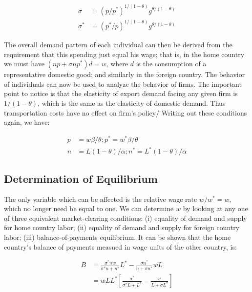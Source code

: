 \begin{equation}
    \begin{aligned}
        \sigma & = (p/p^*)^{1/(1 - \theta)}g^{\theta / (1 - \theta)} \\
        \sigma^* & = (p^*/p)^{1/(1 - \theta)}g^{\theta / (1 - \theta)}
    \end{aligned}
\end{equation}

The overall demand pattern of each individual can then be derived from the requirement that this spending just equal his wage; that is, in the home country we must have $(np + \sigma np^*)d = w$, where $d$ is the consumption of a representative domestic good; and similarly in the foreign country. The behavior of individuals can now be used to analyze the behavior of firms. The important point to notice is that the elasticity of export demand facing any given firm is $1 / (1 - \theta)$, which is the same as the elasticity of domestic demand. Thus transportation costs have no effect on firm's policy/ Writing out these conditions again, we have:

\begin{equation}
    \begin{aligned}
        p & = w\beta / \theta; p^* = w^* \beta / \theta \\
        n & = L(1 - \theta) / \alpha; n^* = L^*(1 - \theta) / \alpha
    \end{aligned}
\end{equation}

\subsection{Determination of Equilibrium}

The only variable which can be affected is the relative wage rate $w / w^* = w$, which no longer need be equal to one. We can determine $w$ by looking at any one of three equivalent market-clearing conditions: (i) equality of demand and supply for home country labor; (ii) equality of demand and supply for foreign country labor; (iii) balance-of-payments equilibrium. It can be shown that the home country's balance of payments measued in wage units of the other country, is:

\begin{equation}
    \begin{aligned}
        B & = \frac{\sigma^* nw}{\sigma^*n + n^*}L^* - \frac{\sigma n^*}{n + \sigma n^*}wL \\
        & = wLL^* \left[ \frac{\sigma^*}{\sigma^* L + L^*} - \frac{\sigma}{L + \sigma L^*}\right]
    \end{aligned}
\end{equation}

